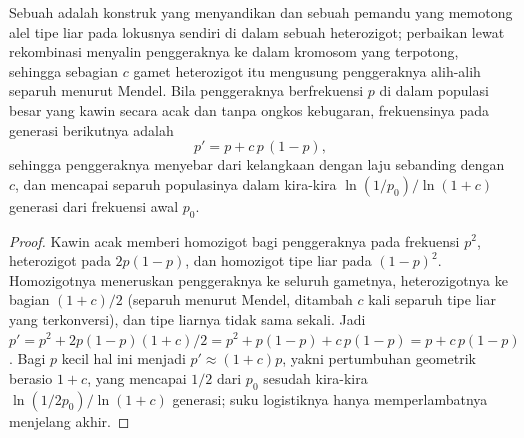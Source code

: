 \begin{theorem}\label{thm:b3:genetic-engineering:drive}
Sebuah \emph{} adalah konstruk yang menyandikan  dan sebuah
pemandu yang memotong alel tipe liar pada lokusnya sendiri di dalam sebuah
heterozigot; perbaikan lewat rekombinasi menyalin penggeraknya ke dalam
kromosom yang terpotong, sehingga sebagian $c$ gamet heterozigot itu mengusung
penggeraknya alih-alih separuh menurut Mendel. Bila penggeraknya berfrekuensi
$p$ di dalam populasi besar yang kawin secara acak dan tanpa ongkos kebugaran,
frekuensinya pada generasi berikutnya adalah
\[
p' = p + c\,p\,(1 - p),
\]
sehingga penggeraknya menyebar dari kelangkaan dengan laju sebanding dengan
$c$, dan mencapai separuh populasinya dalam kira-kira
$\ln(1/p_{0})/\ln(1 + c)$ generasi dari frekuensi awal $p_{0}$.
\end{theorem}
\begin{proof}
Kawin acak memberi homozigot bagi penggeraknya pada frekuensi $p^{2}$,
heterozigot pada $2p(1-p)$, dan homozigot tipe liar pada $(1-p)^{2}$.
Homozigotnya meneruskan penggeraknya ke seluruh gametnya, heterozigotnya ke
bagian $(1 + c)/2$ (separuh menurut Mendel, ditambah $c$ kali separuh tipe
liar yang terkonversi), dan tipe liarnya tidak sama sekali. Jadi $p' = p^{2} + 2p(1-p)(1+c)/2
= p^{2} + p(1-p) + c\,p(1-p) = p + c\,p(1-p)$. Bagi $p$ kecil hal ini menjadi
$p' \approx (1+c)p$, yakni pertumbuhan geometrik berasio $1 + c$, yang mencapai
$1/2$ dari $p_{0}$ sesudah kira-kira $\ln(1/2p_{0})/\ln(1+c)$ generasi; suku
logistiknya hanya memperlambatnya menjelang akhir.
\end{proof}

